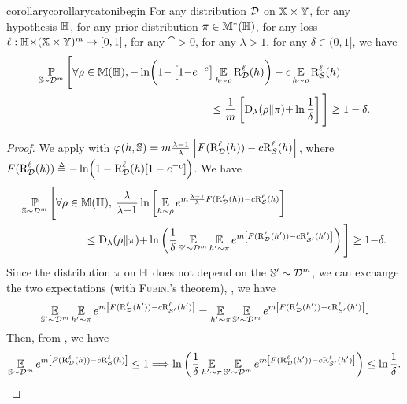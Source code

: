 \begin{noaddcontents}
\begin{restatable}{corollary}{corollarycatonibegin}
For any distribution $\mathcal{D}$ on $\mathbb{X}\times\mathbb{Y}$, for any hypothesis $\mathbb{H}$, for any prior distribution $\pi\in\mathbb{M}^{*}(\mathbb{H})$, for any loss $\ell: \mathbb{H}{\times}(\mathbb{X}\times\mathbb{Y})^m \to [0, 1]$, for any $\cat>0$, for any $\lambda>1$, for any $\delta\in(0, 1]$, we have
\begin{align*}
    \PP_{\S\sim\D^\m}\Bigg[ \forall\Q\in\M(\H), 
    -\ln\!\LP 1{-}\LB1{-}e^{{-}\cat}\RB\EE_{\h\sim\Q}\RiskLoss_{\D}(\h)\RP&-\cat\EE_{\h\sim\Q}\RiskLoss_{\dS}(\h)\nonumber\\
    &\hspace{-2cm}\le \frac{1}{\m}\LB\Renyi_{\lambda}(\Q\|\P){+}\ln\frac{1}{\delta}\RB\Bigg] \ge 1-\delta.
\end{align*}
\label{ap:pac-bayes:corollary:catoni-begin}
\end{restatable}
\begin{proof}
We apply  with $\varphi(h,\mathbb{S}) = m\frac{\lambda{-}1}{\lambda}\left[F(\text{R}^{\ell}_{\mathcal{D}}(h))-c\text{R}^{\ell}_{\mathcal{S}}(h)\right]$, where $F(\text{R}^{\ell}_{\mathcal{D}}(h))\triangleq-\ln\!\left( 1-\text{R}^{\ell}_{\mathcal{D}}(h)\!\left[1-e^{-c}\right]\right)$.
We have
\begin{align*}
    \PP_{\S\sim\D^\m}\Bigg[\forall\Q\in\M(\H),\   
    &\frac{\lambda}{\lambda{-}1}\ln \LB\EE_{\h{\sim}\Q}e^{\m\frac{\lambda-1}{\lambda}\catF(\RiskLoss_{\D}(\h))-\cat\RiskLoss_{\dS}(\h)}\RB\\
    &\hspace{-1cm}\le \Renyi_{\lambda}(\Q\|\P){+}\ln\LP\frac{1}{\delta}\EE_{\S'\sim\D^\m}\EE_{\h'\sim\P}e^{\m\LB\catF(\RiskLoss_{\D}(\h'))-\cat\RiskLoss_{\dS'}(\h')\RB}\RP\Bigg] \ge 1{-}\delta.
\end{align*}
Since the distribution $\pi$ on $\mathbb{H}$ does not depend on the $\mathbb{S}'\sim\mathcal{D}^m$, we can exchange the two expectations (with \textsc{Fubini}'s theorem), \ie, we have 
\begin{align*}
\operatorname*{\mathbb{E}}_{\mathbb{S}'\sim\mathcal{D}^m}\operatorname*{\mathbb{E}}_{h'\sim\pi}e^{m\left[F(\text{R}^{\ell}_{\mathcal{D}}(h'))-c\text{R}^{\ell}_{\mathcal{S}'}(h')\right]} = \operatorname*{\mathbb{E}}_{h'\sim\pi}\operatorname*{\mathbb{E}}_{\mathbb{S}'\sim\mathcal{D}^m}e^{m\left[F(\text{R}^{\ell}_{\mathcal{D}}(h'))-c\text{R}^{\ell}_{\mathcal{S}'}(h')\right]}.
\end{align*}
Then, from , we have
\begin{align*}
    \operatorname*{\mathbb{E}}_{\mathbb{S}\sim\mathcal{D}^m}e^{m\left[F(\text{R}^{\ell}_{\mathcal{D}}(h))-c\text{R}^{\ell}_{\mathcal{S}}(h)\right]} \le 1 \Longrightarrow  \ln\left(\frac{1}{\delta}\operatorname*{\mathbb{E}}_{h'\sim\pi}\operatorname*{\mathbb{E}}_{\mathbb{S}'\sim\mathcal{D}^m}e^{m\left[F(\text{R}^{\ell}_{\mathcal{D}}(h'))-c\text{R}^{\ell}_{\mathcal{S}'}(h')\right]}\right) \le \ln\frac{1}{\delta}.
\end{align*}


\end{proof}
\end{noaddcontents}

